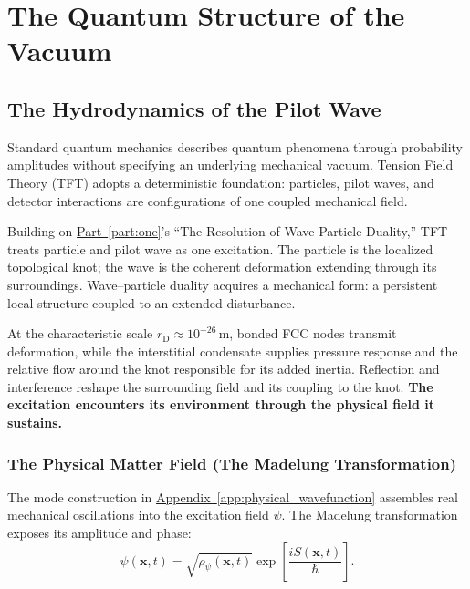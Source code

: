 \chapter{The Quantum Structure of the Vacuum}
\label{chap:quantum_vacuum}

\section{The Hydrodynamics of the Pilot Wave}
\label{sec:pilot_wave}

Standard quantum mechanics describes quantum phenomena through probability amplitudes without specifying an underlying mechanical vacuum. Tension Field Theory (TFT) adopts a deterministic foundation: particles, pilot waves, and detector interactions are configurations of one coupled mechanical field.

Building on \hyperref[part:one]{Part~\ref*{part:one}}'s ``The Resolution of Wave-Particle Duality,'' TFT treats particle and pilot wave as one excitation. The particle is the localized topological knot; the wave is the coherent deformation extending through its surroundings. Wave--particle duality acquires a mechanical form: a persistent local structure coupled to an extended disturbance.

At the characteristic scale $r_{\mathrm D}\approx10^{-26}\,\mathrm m$, bonded FCC nodes transmit deformation, while the interstitial condensate supplies pressure response and the relative flow around the knot responsible for its added inertia. Reflection and interference reshape the surrounding field and its coupling to the knot. \textbf{The excitation encounters its environment through the physical field it sustains.}

\subsection{The Physical Matter Field (The Madelung Transformation)}
\label{sec:quantum_action}

The mode construction in \hyperref[app:physical_wavefunction]{Appendix~\ref*{app:physical_wavefunction}} assembles real mechanical oscillations into the excitation field $\psi$. The Madelung transformation \cite{Madelung_1927} exposes its amplitude and phase:
\begin{equation}
    \psi(\mathbf x,t)
    =
    \sqrt{\rho_\psi(\mathbf x,t)}
    \exp\!\left[\frac{iS(\mathbf x,t)}{\hbar}\right].
\end{equation}

